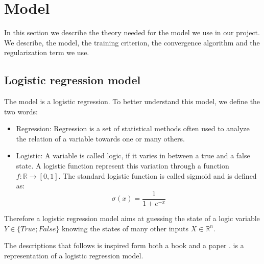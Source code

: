 


\section{Model}
\label{sec:model}
	
	In this section we describe the theory needed for the model we use in our project. We describe, the model, the training criterion, the convergence algorithm and the regularization term we use.
	

	\subsection{Logistic regression model}
	\label{sec:logistic_regression}
		The model is a logistic regression. To better understand this model, we define the two words:

		\begin{itemize}
			\item Regression: Regression is a set of statistical methods often used to analyze the relation of a variable towards one or many others.
			\item Logistic: A variable is called logic, if it varies in between a true and a false state. A logistic function represent this variation through a function $f:\mathbb{R} \rightarrow [0,1] $. The standard logistic function is called sigmoid and is defined as:
			$$ \sigma(x) = \frac{1}{1+e^{-x}} $$
		\end{itemize}

		Therefore a logistic regression model aims at guessing the state of a logic variable $Y \in \{True;False\}$ knowing the states of many other inputs $X \in \mathbb{R}^n$.


		The descriptions that follows is inspired form both a book \cite{hosmer2004applied} and a paper \cite{elkan2013maximum}.  is a representation of  a logistic regression model.

